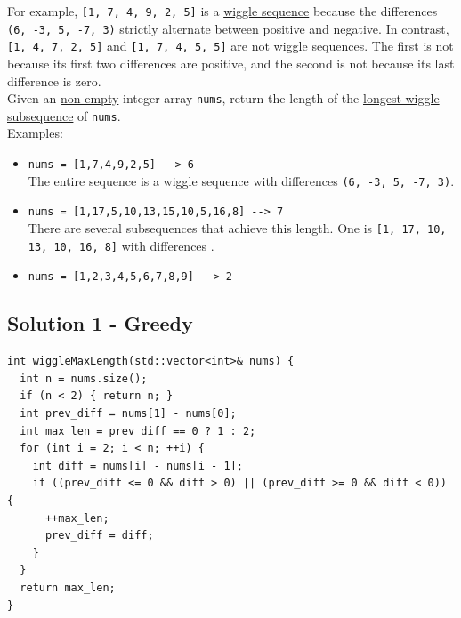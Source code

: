 For example, {\colorbox{CodeBackground}{\lstinline|[1, 7, 4, 9, 2, 5]|}} is a \ul{wiggle sequence} because the differences {\colorbox{CodeBackground}{\lstinline|(6, -3, 5, -7, 3)|}} strictly alternate between positive and negative. In contrast, {\colorbox{CodeBackground}{\lstinline|[1, 4, 7, 2, 5]|}} and {\colorbox{CodeBackground}{\lstinline|[1, 7, 4, 5, 5]|}} are not \ul{wiggle sequences}. The first is not because its first two differences are positive, and the second is not because its last difference is zero.\\

Given an \ul{non-empty} integer array {\colorbox{CodeBackground}{\lstinline|nums|}}, return the length of the \ul{longest wiggle subsequence} of {\colorbox{CodeBackground}{\lstinline|nums|}}.\\

Examples:
\begin{itemize}
\item {\colorbox{CodeBackground}{\lstinline|nums = [1,7,4,9,2,5] --> 6|}}\\
The entire sequence is a wiggle sequence with differences {\colorbox{CodeBackground}{\lstinline|(6, -3, 5, -7, 3)|}}.
\item {\colorbox{CodeBackground}{\lstinline|nums = [1,17,5,10,13,15,10,5,16,8] --> 7|}}\\
There are several subsequences that achieve this length.
One is {\colorbox{CodeBackground}{\lstinline|[1, 17, 10, 13, 10, 16, 8]|}} with differences .
\item {\colorbox{CodeBackground}{\lstinline|nums = [1,2,3,4,5,6,7,8,9] --> 2|}}
\end{itemize}

\subsection*{Solution 1 - Greedy}
\begin{lstlisting}
int wiggleMaxLength(std::vector<int>& nums) {
  int n = nums.size();
  if (n < 2) { return n; }
  int prev_diff = nums[1] - nums[0];
  int max_len = prev_diff == 0 ? 1 : 2;
  for (int i = 2; i < n; ++i) {
    int diff = nums[i] - nums[i - 1];
    if ((prev_diff <= 0 && diff > 0) || (prev_diff >= 0 && diff < 0)) {
      ++max_len;
      prev_diff = diff;
    }
  }
  return max_len;
}
\end{lstlisting}

